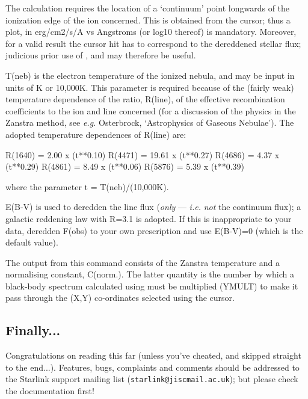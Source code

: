 \documentclass[twoside,11pt,noabs,nolof]{starlink}
\begin{document}
The calculation requires the location of a `continuum' point longwards
of the ionization edge of the ion concerned. This is obtained from the
cursor; thus a plot, in erg/cm2/s/A vs Angstroms (or log10 thereof) is
mandatory. Moreover, for a valid result the cursor hit has to
correspond to the dereddened stellar flux; judicious prior use of
,    and   may therefore be useful.

T(neb) is the electron temperature of the ionized nebula, and may be
input in units of K or 10,000K. This parameter is required because of
the (fairly weak) temperature dependence of the ratio, R(line), of the
effective recombination coefficients to the ion and line concerned
(for a discussion of the physics in the Zanstra method, see \emph{e.g.}
Osterbrock, `Astrophysics of Gaseous Nebulae'). The adopted
temperature dependences of R(line) are:

\begin{terminalv}
R(1640) = 2.00 x (t**0.10)
R(4471) = 19.61 x (t**0.27)
R(4686) = 4.37 x (t**0.29)
R(4861) = 8.49 x (t**0.06)
R(5876) = 5.39 x (t**0.39)
\end{terminalv}

where the parameter t = T(neb)/(10,000K).

E(B-V) is used to deredden the line flux (\emph{only} --- \emph{i.e.}
\emph{not} the continuum flux); a galactic reddening law with R=3.1 is
adopted. If this is inappropriate to your data, deredden F(obs) to
your own prescription and use E(B-V)=0 (which is the default value).

The output from this command consists of the Zanstra temperature and a
normalising constant, C(norm.). The latter quantity is the number by
which a black-body spectrum calculated using   must be multiplied
(YMULT) to make it pass through the (X,Y) co-ordinates selected using
the cursor.

\subsection{Finally...}
Congratulations on reading this far (unless you've cheated, and skipped
straight to the end...). Features, bugs, complaints and comments should
be addressed to the Starlink support mailing list
(\texttt{starlink@jiscmail.ac.uk}); but please check the
documentation first!

\newpage
\end{document}
